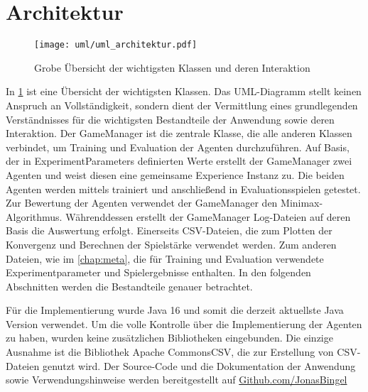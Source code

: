 \section{Architektur}

\begin{figure}[h]
    \centering
    \texttt{[image: uml/uml\_architektur.pdf]}
    \caption{Grobe Übersicht der wichtigsten Klassen und deren Interaktion}
    \label{fig:uml_architektur}
\end{figure}

In \cref{fig:uml_architektur} ist eine Übersicht der wichtigsten Klassen.
Das UML-Diagramm stellt keinen Anspruch an Vollständigkeit, sondern dient der Vermittlung eines grundlegenden Verständnisses für die wichtigsten Bestandteile der Anwendung sowie deren Interaktion. 
Der GameManager ist die zentrale Klasse, die alle anderen Klassen verbindet, um Training und Evaluation der Agenten durchzuführen.  
Auf Basis, der in ExperimentParameters definierten Werte erstellt der GameManager zwei Agenten und weist diesen eine gemeinsame Experience Instanz zu. 
Die beiden Agenten werden mittels \splay trainiert und anschließend in Evaluationsspielen getestet. 
Zur Bewertung der Agenten verwendet der GameManager den Minimax-Algorithmus. 
Währenddessen erstellt der GameManager Log-Dateien auf deren Basis die Auswertung erfolgt.
Einerseits CSV-Dateien, die zum Plotten der Konvergenz und Berechnen der Spielstärke verwendet werden.
Zum anderen Dateien, wie im \cref{chap:meta}, die für Training und Evaluation verwendete Experimentparameter und Spielergebnisse enthalten. 
In den folgenden Abschnitten werden die Bestandteile genauer betrachtet.

Für die Implementierung wurde Java 16 und somit die derzeit aktuellste Java Version verwendet. 
Um die volle Kontrolle über die Implementierung der Agenten zu haben, wurden keine zusätzlichen Bibliotheken eingebunden. 
Die einzige Ausnahme ist die Bibliothek Apache CommonsCSV, die zur Erstellung von CSV-Dateien genutzt wird. 
Der Source-Code und die Dokumentation der Anwendung sowie Verwendungshinweise werden bereitgestellt auf \href{http://github.com/JonasBingel/ThesisHSMZ-RLTicTacToe-Java}{Github.com/JonasBingel}